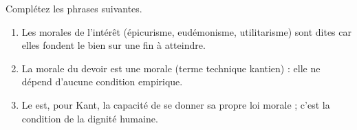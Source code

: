 \documentclass[11pt]{article}
\begin{document}
\begin{exercice}
Complétez les phrases suivantes.
\begin{enumerate}
    \item Les morales de l'intérêt (épicurisme, eudémonisme, utilitarisme) sont dites \underline{\hspace{4cm}} car elles fondent le bien sur une fin à atteindre.
    \item La morale du devoir est une morale \underline{\hspace{3cm}} (terme technique kantien) : elle ne dépend d'aucune condition empirique.
    \item Le \underline{\hspace{3cm}} est, pour Kant, la capacité de se donner sa propre loi morale ; c'est la condition de la dignité humaine.
\end{enumerate}
\end{exercice}
\end{document}
